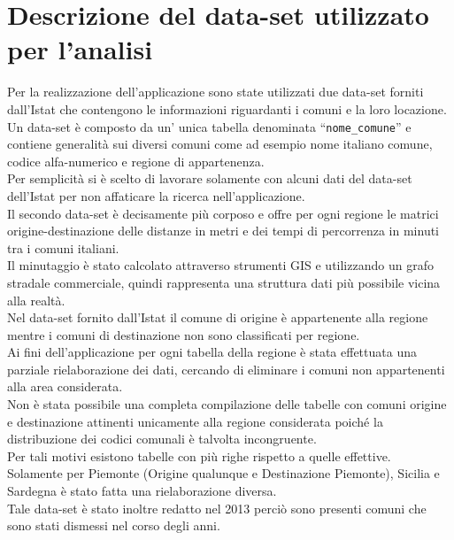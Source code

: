 \documentclass[a4paper,12pt]{report}
\begin{document}
\chapter{Descrizione del data-set utilizzato per l’analisi}
Per la realizzazione dell'applicazione sono state utilizzati due data-set forniti dall'Istat che contengono le informazioni riguardanti i comuni e la loro locazione.\\
Un data-set è composto da un' unica tabella denominata ``\texttt{nome\_comune}'' e contiene generalità sui diversi comuni
come ad esempio nome italiano comune, codice alfa-numerico e regione di appartenenza.\\
Per semplicità si è scelto di lavorare solamente con alcuni dati del data-set dell'Istat
per non affaticare la ricerca nell'applicazione.\\
Il secondo data-set è decisamente più corposo e offre per ogni regione le matrici 
origine-destinazione delle distanze in metri e dei tempi di percorrenza in minuti tra i comuni 
italiani.\\
Il minutaggio è stato calcolato attraverso strumenti GIS e utilizzando un grafo stradale 
commerciale, quindi rappresenta una struttura dati più possibile vicina alla realtà.\\
Nel data-set fornito dall'Istat il comune di origine è appartenente alla regione mentre
i comuni di destinazione non sono classificati per regione.\\
Ai fini dell'applicazione per ogni tabella della regione è stata effettuata una parziale rielaborazione
dei dati, cercando di eliminare i comuni non appartenenti alla area considerata.\\
Non è stata possibile una completa compilazione delle tabelle con comuni origine e destinazione
attinenti unicamente alla regione considerata poiché la distribuzione dei codici comunali è
talvolta incongruente.\\
Per tali motivi esistono tabelle con più righe rispetto a quelle effettive.\\
Solamente per Piemonte (Origine qualunque e Destinazione Piemonte), Sicilia e Sardegna è stato
fatta una rielaborazione diversa.\\
Tale data-set è stato inoltre redatto nel 2013 perciò sono presenti comuni che sono stati dismessi 
nel corso degli anni.
\end{document}
